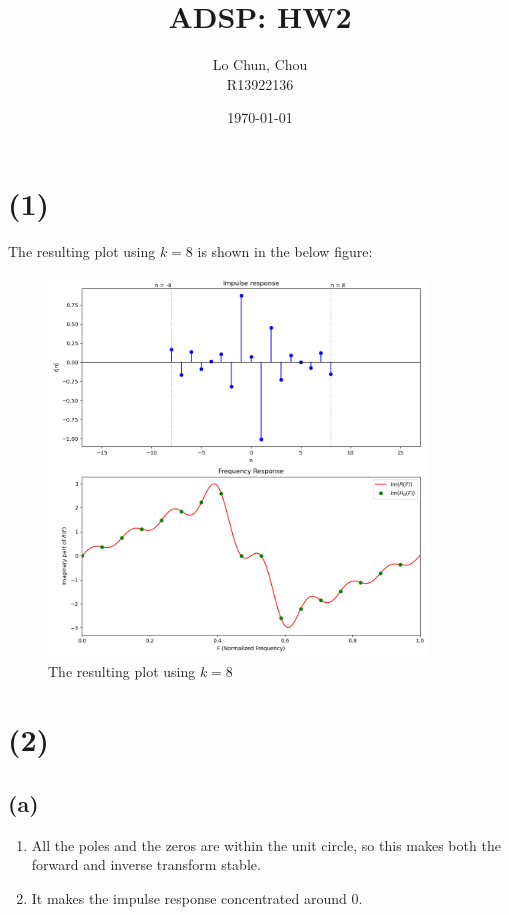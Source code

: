 \documentclass{article}
\title{ADSP: HW2}
\author{Lo Chun, Chou \\ R13922136}
\date\today
\begin{document}
\setlength{\parindent}{0pt}
\maketitle 

\section*{(1)}

The resulting plot using $k = 8$ is shown in the below figure:

\begin{figure}[H]
    \centering
    \includegraphics[width=0.9\textwidth]{prob1_images/required_plot.png}
    \caption{The resulting plot using $k = 8$}
\end{figure}

\section*{(2)}
\subsection*{(a)}

\begin{enumerate}
    \item All the poles and the zeros are within the unit circle, 
    so this makes both the forward and inverse transform stable.  
    \item It makes the impulse response concentrated around $0$.
\end{enumerate}
\end{document}
